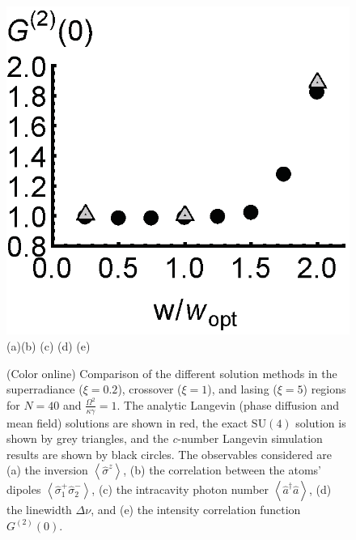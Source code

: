 \documentclass[aps,
twocolumn,
showpacs,
superscriptaddress,groupedaddress]{revtex4}
\begin{document}
\begin{figure}
\begin{center}
	\hspace{-5.0mm} \includegraphics[scale =0.38] {N40LaserG2.eps}\\ \vspace{1mm}
	\hspace{5mm}(a)\hspace{30mm}(b) \hspace{30mm}(c) \hspace{30mm}(d) \hspace{30mm}(e)
\end{center}
		\vspace{-5mm}
\caption{(Color online) Comparison of the different solution methods in
the superradiance ($\xi=0.2$), crossover ($\xi=1$), and lasing ($\xi=5$)
regions for $N=40$ and $\frac{\Omega^2}{\kappa \gamma}=1$.  The analytic
Langevin (phase diffusion and mean field) solutions are shown in red, 
the exact $\mathrm{SU}(4)$ solution is shown by grey triangles, and the
\textit{c}-number Langevin simulation results are shown by black
circles. The observables considered are (a) the inversion
$\left<\hat{\sigma}^{z}\right>$, (b) the correlation between the atoms'
dipoles $\left<\hat{\sigma}_{1}^{+} \hat{\sigma}_{2}^{-}\right>$, (c)
the intracavity photon number $\left<\hat{a}^{\dagger}\hat{a}\right>$,
(d) the linewidth $\Delta \nu$, and (e) the intensity correlation
function $G^{(2)}(0)$.}
\label{N40Comparison}
\end{figure}
\end{document}
